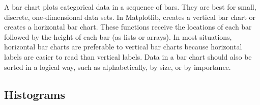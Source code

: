A bar chart plots categorical data in a sequence of bars.
They are best for small, discrete, one-dimensional data sets.
In Matplotlib,  creates a vertical bar chart or  creates a horizontal bar chart.
These functions receive the locations of each bar followed by the height of each bar (as lists or arrays).
In most situations, horizontal bar charts are preferable to vertical bar charts because horizontal labels are easier to read than vertical labels.
Data in a bar chart should also be sorted in a logical way, such as alphabetically, by size, or by importance.

\subsection*{Histograms} %

